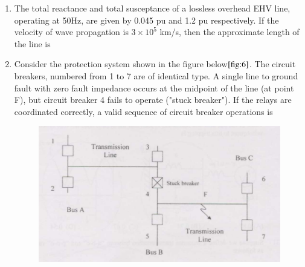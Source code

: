 \documentclass[journal]{IEEEtran}
\numberwithin{equation}{enumi}
\numberwithin{figure}{enumi}
\begin{document}
\begin{enumerate}
\begin{enumerate}
\end{enumerate}
\bigskip
\item The total reactance and total susceptance of a lossless overhead EHV line, operating at 50Hz, are given by 0.045 pu and 1.2 pu respectively. If the velocity of wave propagation is $3 \times 10^5$ km/s, then the approximate length of the line is
\begin{enumerate}
\end{enumerate}
\bigskip
\item Consider the protection system shown in the figure below$\ref{fig:6}$. The circuit breakers, numbered from 1 to 7 are of identical type. A single line to ground fault with zero fault impedance occurs at the midpoint of the line (at point F), but circuit breaker 4 fails to operate ("stuck breaker"). If the relays are coordinated correctly, a valid sequence of circuit breaker operations is
\begin{figure}[!ht]
    \centering
    \includegraphics[width=\linewidth]{figs/6.png}
    \caption{}
    \label{fig:6}
    \end{figure}
\begin{enumerate}
\end{enumerate}
\end{enumerate}
\end{document}
